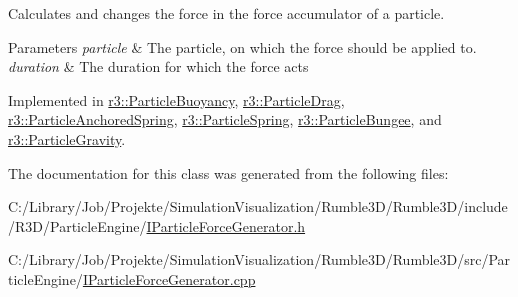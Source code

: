 Calculates and changes the force in the force accumulator of a particle. 


\begin{DoxyParams}{Parameters}
{\em particle} & The particle, on which the force should be applied to. \\
\hline
{\em duration} & The duration for which the force acts \\
\hline
\end{DoxyParams}


Implemented in \mbox{\hyperlink{classr3_1_1_particle_buoyancy_ad1249e51508770fd9b1775c8e22eb51a}{r3\+::\+Particle\+Buoyancy}}, \mbox{\hyperlink{classr3_1_1_particle_drag_abbfc4f053bb921be0068f8928c300384}{r3\+::\+Particle\+Drag}}, \mbox{\hyperlink{classr3_1_1_particle_anchored_spring_aa445db9e0efcc25a422348f4e580ed7f}{r3\+::\+Particle\+Anchored\+Spring}}, \mbox{\hyperlink{classr3_1_1_particle_spring_a113e7bdf36d5edf020abecec5a0fb730}{r3\+::\+Particle\+Spring}}, \mbox{\hyperlink{classr3_1_1_particle_bungee_a04de21f7e418f572a9c9dfc936384b96}{r3\+::\+Particle\+Bungee}}, and \mbox{\hyperlink{classr3_1_1_particle_gravity_a9535686bf25375d94bbe0451c089b788}{r3\+::\+Particle\+Gravity}}.



The documentation for this class was generated from the following files\+:\begin{DoxyCompactItemize}
\item 
C\+:/\+Library/\+Job/\+Projekte/\+Simulation\+Visualization/\+Rumble3\+D/\+Rumble3\+D/include/\+R3\+D/\+Particle\+Engine/\mbox{\hyperlink{_i_particle_force_generator_8h}{I\+Particle\+Force\+Generator.\+h}}\item 
C\+:/\+Library/\+Job/\+Projekte/\+Simulation\+Visualization/\+Rumble3\+D/\+Rumble3\+D/src/\+Particle\+Engine/\mbox{\hyperlink{_i_particle_force_generator_8cpp}{I\+Particle\+Force\+Generator.\+cpp}}\end{DoxyCompactItemize}
